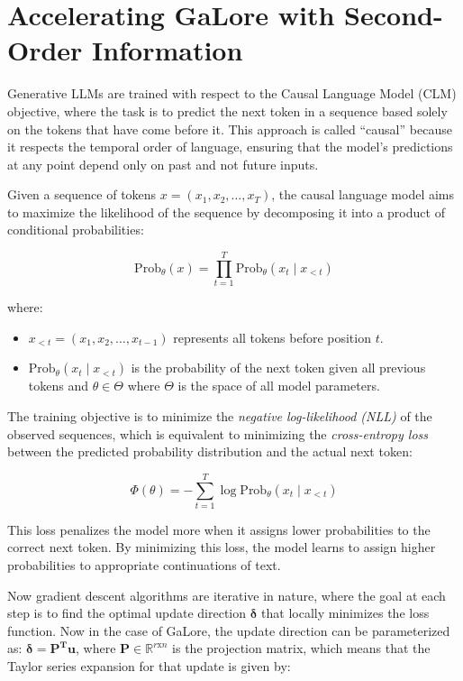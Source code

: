 \def\cG{\mathcal{G}}
\def\rr{\mathbb{R}}

\section{Accelerating GaLore with Second-Order Information}
Generative LLMs are trained with respect to the Causal Language Model (CLM) objective, where the task is to predict the next token in a sequence based solely on the tokens that have come before it. This approach is called ``causal'' because it respects the temporal order of language, ensuring that the model's predictions at any point depend only on past and not future inputs.

Given a sequence of tokens \( x = (x_1, x_2, \dots, x_T) \), the causal language model aims to maximize the likelihood of the sequence by decomposing it into a product of conditional probabilities:

\[
\text{Prob}_{\theta}(x) = \prod_{t=1}^T \text{Prob}_{\theta}(x_t \mid x_{<t})
\]

where:

\begin{itemize}
    \item \( x_{<t} = (x_1, x_2, \dots, x_{t-1}) \) represents all tokens before position \( t \).
    \item \( \text{Prob}_{\theta}(x_t \mid x_{<t}) \) is the probability of the next token given all previous tokens and \( \theta \in \Theta \) where \( \Theta\) is the space of all model parameters.
\end{itemize}

The training objective is to minimize the \textit{negative log-likelihood (NLL)} of the observed sequences, which is equivalent to minimizing the \textit{cross-entropy loss} between the predicted probability distribution and the actual next token:

\[
\Phi(\theta) = -\sum_{t=1}^T \log \text{Prob}_{\theta}(x_t \mid x_{<t})
\]

This loss penalizes the model more when it assigns lower probabilities to the correct next token. By minimizing this loss, the model learns to assign higher probabilities to appropriate continuations of text.

Now gradient descent algorithms are iterative in nature, where the goal at each step is to find the optimal update direction $\mathbf{\delta}$ that locally minimizes the loss function. Now in the case of GaLore, the update direction can be parameterized as: \(\mathbf{\delta} = \mathbf{P^T u}\), where \(\mathbf{P} \in \mathbb{R}^{r\text{x}n}\) is the projection matrix, which means that the Taylor series expansion for that update is given by:

